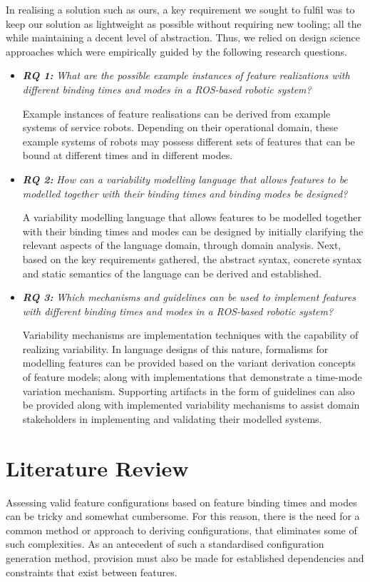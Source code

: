 \documentclass[conference]{IEEEtran}
\begin{document}
In realising a solution such as ours, a key requirement we sought to fulfil was to keep our solution as lightweight as possible without requiring new tooling; all the while maintaining a decent level of abstraction. Thus, we relied on design science approaches which were empirically guided by the following research questions.
\begin{itemize}
     \item \textit{\textbf{RQ 1:}} \emph{What are the possible example instances of feature realizations with different binding times and modes in a ROS-based robotic system?}
     
     Example instances of feature realisations can be derived from example systems of service robots. Depending on their operational domain, these example systems of robots may possess different sets of features that can be bound at different times and in different modes.
    
    \item \textit{\textbf{RQ 2:}} \emph{How can a variability modelling language that allows features to be modelled together with their binding times and binding modes be designed?}
    
    A variability modelling language that allows features to be modelled together with their binding times and modes can be designed by initially clarifying the relevant aspects of the language domain, through domain analysis. Next, based on the key requirements gathered, the abstract syntax, concrete syntax and static semantics of the language can be derived and established.
    
    \item \textit{\textbf{RQ 3:}} \emph{Which mechanisms and guidelines can be used to implement features with different binding times and modes in a ROS-based robotic system?}
    
    Variability mechanisms are implementation techniques with the capability of realizing variability. In language designs of this nature, formalisms for modelling features can be provided based on the variant derivation concepts of feature models; along with implementations that demonstrate a time-mode variation mechanism. Supporting artifacts in the form of guidelines can also be provided along with implemented variability mechanisms to assist domain stakeholders in implementing and validating their modelled systems.
\end{itemize}

\section{Literature Review}
Assessing valid feature configurations based on feature binding times and modes can be tricky and somewhat cumbersome. For this reason, there is the need for a common method or approach to deriving configurations, that eliminates some of such complexities. As an antecedent of such a standardised configuration generation method, provision must also be made for established dependencies and constraints that exist between features.
\end{document}
